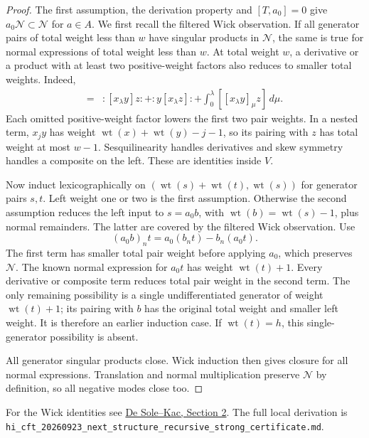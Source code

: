 \documentclass[11pt,a4paper]{article}
\theoremstyle{definition}
\DeclareMathOperator{\wt}{wt}
\newcommand{\artifact}[1]{\textnormal{\nolinkurl{#1}}}
\begin{document}
\begin{proof}
The first assumption, the derivation property and \([T,a_0]=0\)
give \(a_0\mathcal N\subset\mathcal N\) for \(a\in A\).
We first recall the filtered Wick observation. If all generator pairs
of total weight less than \(w\) have singular products in \(\mathcal N\),
the same is true for normal expressions of total weight less than \(w\).
At total weight \(w\), a derivative or a product with at least two
positive-weight factors also reduces to smaller total weights. Indeed,
\begin{align*}
 [x_\lambda :yz:]
  ={}&:[x_\lambda y]z:+:y[x_\lambda z]:
       +\int_0^\lambda [[x_\lambda y]_\mu z]\,d\mu.
\end{align*}
Each omitted positive-weight factor lowers the first two pair weights.
In a nested term, \(x_jy\) has weight \(\wt(x)+\wt(y)-j-1\), so
its pairing with \(z\) has total weight at most \(w-1\).
Sesquilinearity handles derivatives and skew symmetry handles a
composite on the left. These are identities inside \(V\).

Now induct lexicographically on
\((\wt(s)+\wt(t),\wt(s))\) for generator pairs \(s,t\).
Left weight one or two is the first assumption. Otherwise the second
assumption reduces the left input to \(s=a_0b\), with
\(\wt(b)=\wt(s)-1\), plus normal remainders. The latter are covered
by the filtered Wick observation. Use
\begin{equation}\label{eq:recursive-jacobi}
 (a_0b)_nt=a_0(b_nt)-b_n(a_0t).
\end{equation}
The first term has smaller total pair weight before applying \(a_0\),
which preserves \(\mathcal N\). The known normal expression for
\(a_0t\) has weight \(\wt(t)+1\). Every derivative or composite term
reduces total pair weight in the second term. The only remaining
possibility is a single undifferentiated generator of weight
\(\wt(t)+1\); its pairing with \(b\) has the original total weight
and smaller left weight. It is therefore an earlier induction case.
If \(\wt(t)=h\), this single-generator possibility is absent.

All generator singular products close. Wick induction then gives closure
for all normal expressions. Translation and normal multiplication
preserve \(\mathcal N\) by definition, so all negative modes close too.
\end{proof}
For the Wick identities see
\href{https://arxiv.org/html/math-ph/0312042#S2}{De Sole--Kac, Section 2}.
The full local derivation is
\artifact{hi_cft_20260923_next_structure_recursive_strong_certificate.md}.
\end{document}
